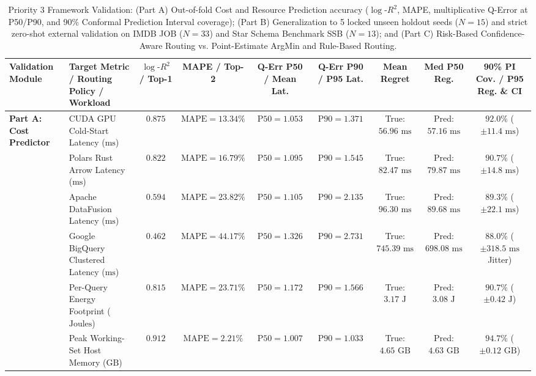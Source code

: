 \documentclass[10pt,a4paper]{article}
\begin{document}
\begin{table}[!t]
\centering
\caption{Priority 3 Framework Validation: (Part A) Out-of-fold Cost and Resource Prediction accuracy ($\log\text{-}R^2$, MAPE, multiplicative Q-Error at P50/P90, and 90\% Conformal Prediction Interval coverage); (Part B) Generalization to 5 locked unseen holdout seeds ($N=15$) and strict zero-shot external validation on IMDB JOB ($N=33$) and Star Schema Benchmark SSB ($N=13$); and (Part C) Risk-Based Confidence-Aware Routing vs. Point-Estimate ArgMin and Rule-Based Routing.}
\label{tab:priority3_validation}
\scriptsize
\setlength{\tabcolsep}{2.7pt}
\renewcommand{\arraystretch}{1.10}
\begin{tabular}{@{}llccccccc@{}}
\toprule
\textbf{Validation Module} & \textbf{Target Metric / Routing Policy / Workload} & \textbf{$\log\text{-}R^2$ / Top-1} & \textbf{MAPE / Top-2} & \textbf{Q-Err P50 / Mean Lat.} & \textbf{Q-Err P90 / P95 Lat.} & \textbf{Mean Regret} & \textbf{Med P50 Reg.} & \textbf{90\% PI Cov. / P95 Reg. \& CI} \\
\midrule
\multirow{6}{*}{\textbf{Part A: Cost Predictor}}
 & CUDA GPU Cold-Start Latency ($\text{ms}$) & $0.875$ & $\text{MAPE}=13.34\%$ & $\text{P50}=1.053$ & $\text{P90}=1.371$ & True: $56.96\text{ ms}$ & Pred: $57.16\text{ ms}$ & $92.0\%$ ($\pm 11.4\text{ ms}$) \\
 & Polars Rust Arrow Latency ($\text{ms}$) & $0.822$ & $\text{MAPE}=16.79\%$ & $\text{P50}=1.095$ & $\text{P90}=1.545$ & True: $82.47\text{ ms}$ & Pred: $79.87\text{ ms}$ & $90.7\%$ ($\pm 14.8\text{ ms}$) \\
 & Apache DataFusion Latency ($\text{ms}$) & $0.594$ & $\text{MAPE}=23.82\%$ & $\text{P50}=1.105$ & $\text{P90}=2.135$ & True: $96.30\text{ ms}$ & Pred: $89.68\text{ ms}$ & $89.3\%$ ($\pm 22.1\text{ ms}$) \\
 & Google BigQuery Clustered Latency ($\text{ms}$) & $0.462$ & $\text{MAPE}=44.17\%$ & $\text{P50}=1.326$ & $\text{P90}=2.731$ & True: $745.39\text{ ms}$ & Pred: $698.08\text{ ms}$ & $88.0\%$ ($\pm 318.5\text{ ms}$ Jitter) \\
 & Per-Query Energy Footprint ($\text{Joules}$) & $0.815$ & $\text{MAPE}=23.71\%$ & $\text{P50}=1.172$ & $\text{P90}=1.566$ & True: $3.17\text{ J}$ & Pred: $3.08\text{ J}$ & $90.7\%$ ($\pm 0.42\text{ J}$) \\
 & Peak Working-Set Host Memory ($\text{GB}$) & $0.912$ & $\text{MAPE}=2.21\%$ & $\text{P50}=1.007$ & $\text{P90}=1.033$ & True: $4.65\text{ GB}$ & Pred: $4.63\text{ GB}$ & $94.7\%$ ($\pm 0.12\text{ GB}$) \\

\end{tabular}
\end{table}
\end{document}
